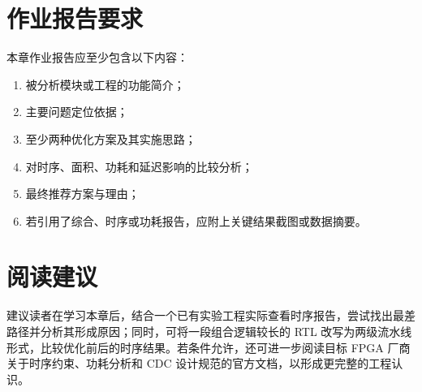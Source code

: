 \section{作业报告要求}\label{ux4f5cux4e1aux62a5ux544aux8981ux6c42}

本章作业报告应至少包含以下内容：

\begin{enumerate}
\def\labelenumi{\arabic{enumi}.}
\tightlist
\item
  被分析模块或工程的功能简介；
\item
  主要问题定位依据；
\item
  至少两种优化方案及其实施思路；
\item
  对时序、面积、功耗和延迟影响的比较分析；
\item
  最终推荐方案与理由；
\item
  若引用了综合、时序或功耗报告，应附上关键结果截图或数据摘要。
\end{enumerate}

\section{阅读建议}\label{ux9605ux8bfbux5efaux8bae}

建议读者在学习本章后，结合一个已有实验工程实际查看时序报告，尝试找出最差路径并分析其形成原因；同时，可将一段组合逻辑较长的
RTL
改写为两级流水线形式，比较优化前后的时序结果。若条件允许，还可进一步阅读目标
FPGA 厂商关于时序约束、功耗分析和 CDC
设计规范的官方文档，以形成更完整的工程认识。
